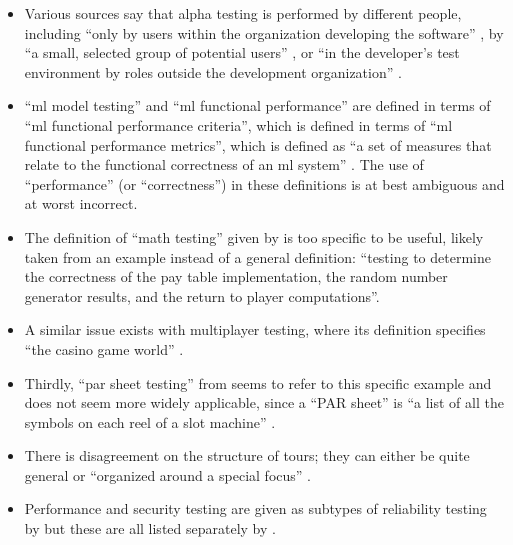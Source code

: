 \begin{itemize}\fi
    \item Various sources say that alpha testing is performed by different
          people, including ``only by users within the organization
          developing the software'' \citep[p.~17]{IEEE2017}, by ``a small,
          selected group of potential users'' \citep[p.~5-8]{SWEBOK2024}, or
          ``in the developer's test environment by roles outside the
          development organization'' \citepISTQB{}.
    \item ``\acf{ml} model testing'' and ``\acs{ml} functional performance''
          are defined in terms of ``\acs{ml} functional performance criteria'',
          which is defined in terms of ``\acs{ml} functional performance
          metrics'', which is defined as ``a set of measures that relate to the
          functional correctness of an \acs{ml} system'' \citepISTQB{}. The use
          of ``performance'' (or ``correctness'') in these definitions is at
          best ambiguous and at worst incorrect.
          \ifnotpaper
    \item The definition of ``math testing'' given by \citetISTQB{} is
          too specific to be useful, likely taken from an example instead of
          a general definition: ``testing to determine the correctness of the
          pay table implementation, the random number generator results, and
          the return to player computations''.
    \item A similar issue exists with multiplayer testing, where its
          definition specifies ``the casino game world'' \citepISTQB{}.
    \item Thirdly, ``par sheet testing'' from \citepISTQB{} seems to
          refer to this specific example and does not seem more widely
          applicable, since a ``PAR sheet'' is ``a list of all the symbols
          on each reel of a slot machine'' \citep{Bluejay2024}.\fi
    \item There is disagreement on the structure of tours; they can either be
          quite general \citep[p.~34]{IEEE2022} or ``organized around a
          special focus'' \citepISTQB{}.
    \item Performance and security testing are given as subtypes of
          reliability testing by \citep{ISO_IEC2023a} but
          these are all listed separately by \citet[p.~53]{Firesmith2015}.
\end{itemize}

\ifnotpaper
